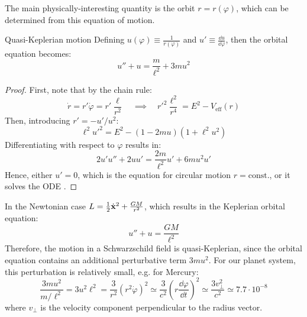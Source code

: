 The main physically-interesting quantity is the orbit $ r = r(\varphi) $, which can be determined from this equation of motion.

\begin{proposition}{Quasi-Keplerian motion}{}
  Defining $ u(\varphi) \equiv \frac{1}{r(\varphi)} $ and $ u' \equiv \frac{\dd u}{\dd \varphi} $, then the orbital equation becomes:
  \begin{equation}
    u'' + u = \frac{m}{\ell^2} + 3mu^2
    \label{eq:schwarz-kepler}
  \end{equation}
\end{proposition}

\begin{proofbox}
  \begin{proof}
    First, note that by the chain rule:
    \begin{equation*}
      \dot{r} = r' \dot{\varphi} = r' \frac{\ell}{r^2}
      \quad \implies \quad
      r'^2 \frac{\ell^2}{r^4} = E^2 - V_\text{eff}(r)
    \end{equation*}
    Then, introducing $ r' = - u' / u^2 $:
    \begin{equation*}
      \ell^2 u'^2 = E^2 - \left( 1 - 2m u \right) \left( 1 + \ell^2 u^2 \right)
    \end{equation*}
    Differentiating with respect to $ \varphi $ results in:
    \begin{equation*}
      2 u' u'' + 2 u u' = \frac{2m}{\ell^2} u' + 6m u^2 u'
    \end{equation*}
    Hence, either $ u' = 0 $, which is the equation for circular motion $ r = \text{const.} $, or it solves the ODE .
  \end{proof}
\end{proofbox}

In the Newtonian case $ L = \frac{1}{2} \dot{\mathbf{x}}^2 + \frac{GM}{r^2} $, which results in the Keplerian orbital equation:
\begin{equation}
  u'' + u = \frac{GM}{\ell^2}
\end{equation}
Therefore, the motion in a Schwarzschild field is quasi-Keplerian, since the orbital equation contains an additional perturbative term $ 3mu^2 $. For our planet system, this perturbation is relatively small, e.g. for Mercury:
\begin{equation*}
  \frac{3mu^2}{m / \ell^2} = 3 u^2 \ell^2 = \frac{3}{r^2} \left( r^2 \dot{\varphi} \right)^2 \simeq \frac{3}{c^2} \left( r \frac{\dd \varphi}{\dd t} \right)^2 \simeq \frac{3 v_\perp^2}{c^2} \simeq 7.7 \cdot 10^{-8}
\end{equation*}
where $ v_\perp $ is the velocity component perpendicular to the radius vector.

